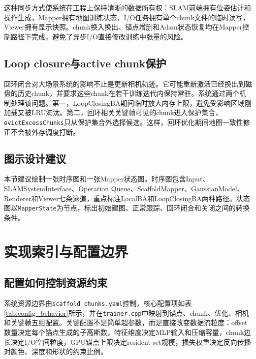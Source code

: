 这种同步方式使系统在工程上保持清晰的数据所有权：SLAM前端拥有位姿估计和操作生成，Mapper拥有地图训练状态，I/O任务拥有单个chunk文件的临时读写，Viewer拥有显示快照。chunk换入换出、锚点增删和Adam状态恢复均在Mapper控制路径下完成，避免了异步I/O直接修改训练中张量的风险。

\subsection{Loop closure与active chunk保护}

回环闭合对大场景系统的影响不止是更新相机轨迹。它可能重新激活已经换出到磁盘的历史chunk，并要求这些chunk在若干训练迭代内保持常驻。系统通过两个机制处理该问题。第一，LoopClosingBA期间临时放大内存上限，避免受影响区域刚加载又被LRU淘汰。第二，回环相关关键帧可见的chunk进入保护集合，\texttt{evictExcessChunks}只从保护集合外选择候选。这样，回环优化期间地图一致性修正不会被外存调度打断。

\subsection{图示设计建议}

本节建议绘制一张时序图和一张Mapper状态图。时序图包含Input、SLAMSystemInterface、Operation Queue、ScaffoldMapper、GaussianModel、Renderer和Viewer七条泳道，重点标注LocalBA和LoopClosingBA两种路径。状态图以\texttt{MapperState}为节点，标出初始建图、正常跟踪、回环闭合和关闭之间的转换条件。

\section{实现索引与配置边界}

\subsection{配置如何控制资源约束}

系统资源边界由\texttt{scaffold\_chunks.yaml}控制，核心配置项如表\ref{tab:config_behavior}所示，并在\texttt{trainer.cpp}中映射到锚点、chunk、优化、相机和关键帧五组配置。关键配置不是简单超参数，而是直接改变数据流粒度：offset数量决定每个锚点生成的子高斯数，特征维度决定MLP输入和压缩容量，chunk边长决定I/O空间粒度，GPU锚点上限决定resident set规模，损失权重决定反向传播对颜色、深度和形状的约束比例。

